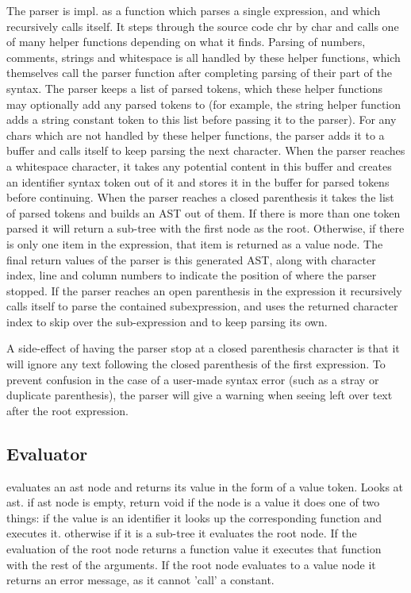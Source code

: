 \documentclass[11pt]{article}
\begin{document}
    The parser is impl. as a function which parses a single expression, and which recursively calls itself. It steps through the source code
    chr by char and calls one of many helper functions depending on what it finds. Parsing of numbers, comments, strings and whitespace is all
    handled by these helper functions, which themselves call the parser function after completing parsing of their part of the syntax. The parser
    keeps a list of parsed tokens, which these helper functions may optionally add any parsed tokens to (for example, the string helper function
    adds a string constant token to this list before passing it to the parser). For any chars which are not handled by these helper functions,
    the parser adds it to a buffer and calls itself to keep parsing the next character. When the parser reaches a whitespace character, it takes
    any potential content in this buffer and creates an identifier syntax token out of it and stores it in the buffer for parsed tokens before
    continuing. When the parser reaches a closed parenthesis it takes the list of parsed tokens and builds an AST out of them. If there is more than
    one token parsed it will return a sub-tree with the first node as the root. Otherwise, if there is only one item in the expression, that item is
    returned as a value node. The final return values of the parser is this generated AST, along with character index, line and column numbers to
    indicate the position of where the parser stopped. If the parser reaches an open parenthesis in the expression it recursively calls itself to
    parse the contained subexpression, and uses the returned character index to skip over the sub-expression and to keep parsing its own.

    A side-effect of having the parser stop at a closed parenthesis character is that it will ignore any text following the closed parenthesis of
    the first expression. To prevent confusion in the case of a user-made syntax error (such as a stray or duplicate parenthesis), the parser
    will give a warning when seeing left over text after the root expression.

\subsection{Evaluator}

    evaluates an ast node and returns its value in the form of a value token.
    Looks at ast.
    if ast node is empty, return void
    if the node is a value it does one of two things: if the value is an identifier it looks up the corresponding function and executes it.
    otherwise if it is a sub-tree it evaluates the root node. If the evaluation of the root node returns a function value it executes that function
    with the rest of the arguments. If the root node evaluates to a value node it returns an error message, as it cannot 'call' a constant.
\end{document}
